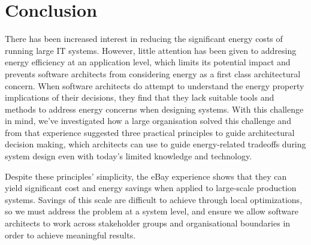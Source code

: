 \section{Conclusion}

There has been increased interest in reducing the significant energy costs of running large IT systems. However, little attention has been given to addresing energy efficiency at an application level, which limits its potential impact and prevents software architects from considering energy as a first class architectural concern.  When software architects do attempt to understand the energy property implications of their decisions, they find that they lack suitable tools and methods to address energy concerns when designing systems. With this challenge in mind, we've investigated how a large organisation solved this challenge and from that experience suggested three practical principles to guide architectural decision making, which architects can use to guide energy-related tradeoffs during system design even with today's limited knowledge and technology.

Despite these principles' simplicity, the eBay experience shows that they can yield significant cost and energy savings when applied to large-scale production systems. Savings of this scale are difficult to achieve through local optimizations, so we must address the problem at a system level, and ensure we allow software architects to work across stakeholder groups and organisational boundaries in order to achieve meaningful results.
